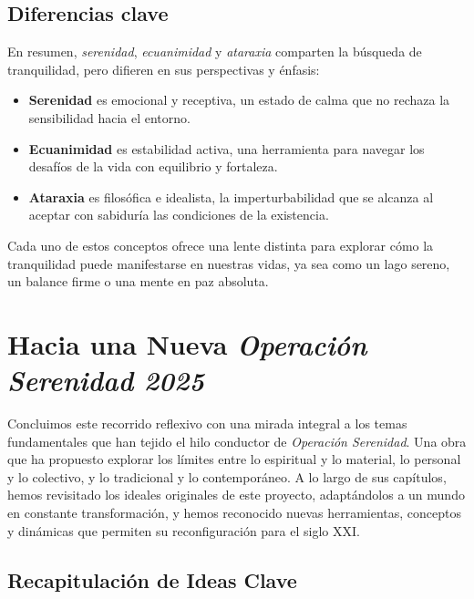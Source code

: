 \documentclass[
]{book}
\providecommand{\tightlist}{%
  \setlength{\itemsep}{0pt}\setlength{\parskip}{0pt}}
\begin{document}
\section{Diferencias clave}\label{diferencias-clave}

En resumen, \emph{serenidad}, \emph{ecuanimidad} y \emph{ataraxia} comparten la búsqueda de tranquilidad, pero difieren en sus perspectivas y énfasis:

\begin{itemize}
\tightlist
\item
  \textbf{Serenidad} es emocional y receptiva, un estado de calma que no rechaza la sensibilidad hacia el entorno.\\
\item
  \textbf{Ecuanimidad} es estabilidad activa, una herramienta para navegar los desafíos de la vida con equilibrio y fortaleza.\\
\item
  \textbf{Ataraxia} es filosófica e idealista, la imperturbabilidad que se alcanza al aceptar con sabiduría las condiciones de la existencia.
\end{itemize}

Cada uno de estos conceptos ofrece una lente distinta para explorar cómo la tranquilidad puede manifestarse en nuestras vidas, ya sea como un lago sereno, un balance firme o una mente en paz absoluta.

\chapter{\texorpdfstring{Hacia una Nueva \emph{Operación Serenidad 2025}}{Hacia una Nueva Operación Serenidad 2025}}\label{hacia-una-nueva-operaciuxf3n-serenidad-2025}

Concluimos este recorrido reflexivo con una mirada integral a los temas fundamentales que han tejido el hilo conductor de \emph{Operación Serenidad}. Una obra que ha propuesto explorar los límites entre lo espiritual y lo material, lo personal y lo colectivo, y lo tradicional y lo contemporáneo. A lo largo de sus capítulos, hemos revisitado los ideales originales de este proyecto, adaptándolos a un mundo en constante transformación, y hemos reconocido nuevas herramientas, conceptos y dinámicas que permiten su reconfiguración para el siglo XXI.

\section{Recapitulación de Ideas Clave}\label{recapitulaciuxf3n-de-ideas-clave}
\end{document}
